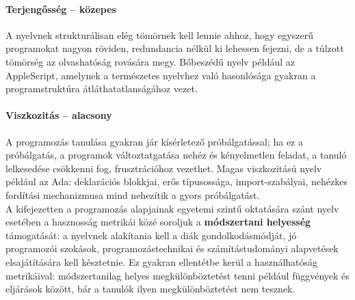 \paragraph{Terjengősség -- közepes} A nyelvnek strukturálisan elég tömörnek kell lennie ahhoz, hogy egyszerű programokat nagyon röviden, redundancia nélkül ki lehessen fejezni, de a túlzott tömörség az olvashatóság rovására megy.
Bőbeszédű nyelv például az AppleScript, amelynek a természetes nyelvhez való hasonlósága gyakran a programstruktúra átláthatatlanságához vezet.

\paragraph{Viszkozitás -- alacsony} A programozás tanulása gyakran jár kísérletező próbálgatással\cite{McIver01}; ha ez a próbálgatás, a programok változtatgatása nehéz és kényelmetlen feladat, a tanuló lelkesedése csökkenni fog, frusztrációhoz vezethet.
Magas viszkozitású nyelv például az Ada: deklarációs blokkjai, erős típusossága, import-szabályai, nehézkes fordítási mechanizmusa mind nehezítik a gyors próbálgatást.\\[\baselineskip]
A kifejezetten a programozás alapjainak egyetemi szintű oktatására szánt nyelv esetében a hasznosság metrikái közé soroljuk a \textbf{módszertani helyesség} támogatását: a nyelvnek alakítania kell a diák gondolkodásmódját, jó programozói szokások, programozástechnikai és számítástudományi alapvetések elsajátítására kell késztetnie.
Ez gyakran ellentétbe kerül a használhatóság metrikáival: módszertanilag helyes megkülönböztetést tenni például függvények és eljárások között, bár a tanulók ilyen megkülönböztetést nem tesznek\cite{McIver01}.
